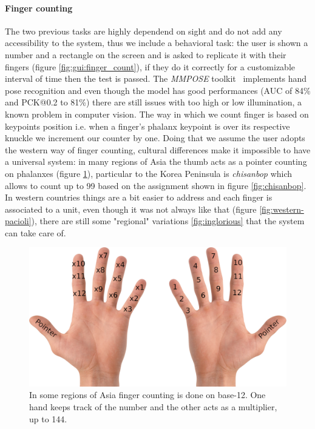 \paragraph{Finger counting}
The two previous tasks are highly dependend on sight and do not add any accessibility to the system, thus we include a behavioral task: the user is shown a number and a rectangle on the screen and is asked to replicate it with their fingers (figure \ref{fig:gui:finger_count}), if they do it correctly for a customizable interval of time then the test is passed.
The \emph{MMPOSE} toolkit~\cite{mmpose} implements hand pose recognition and even though the model has good performances (AUC of 84\% and PCK@0.2 to 81\%) there are still issues with too high or low illumination, a known problem in computer vision.
The way in which we count finger is based on keypoints position i.e. when a finger's phalanx keypoint is over its respective knuckle we increment our counter by one.
Doing that we assume the user adopts the western way of finger counting, cultural differences make it impossible to have a universal system: in many regions of Asia the thumb acts as a pointer counting on phalanxes (figure \ref{fig:asian-count}), particular to the Korea Peninsula is \emph{chisanbop} which allows to count up to 99 based on the assignment shown in figure \ref{fig:chisanbop}.
In western countries things are a bit easier to address and each finger is associated to a unit, even though it was not always like that (figure \ref{fig:western-pacioli}), there are still some "regional" variations \ref{fig:inglorious} that the system can take care of.

\begin{figure}[h!t]
    \centering
    \includegraphics[scale=0.6]{assets/images/finger_count_asia.png}
    \caption{In some regions of Asia finger counting is done on base-12. One hand keeps track of the number and the other acts as a multiplier, up to 144.}
    \label{fig:asian-count}
\end{figure}

